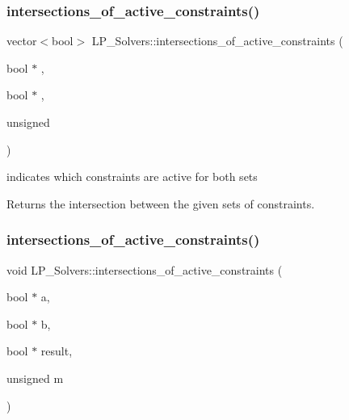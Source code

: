 \subsubsection{\texorpdfstring{intersections\+\_\+of\+\_\+active\+\_\+constraints()}{intersections\_of\_active\_constraints()}\hspace{0.1cm}{\footnotesize\ttfamily [1/2]}}
{\footnotesize\ttfamily vector$<$bool$>$ L\+P\+\_\+\+Solvers\+::intersections\+\_\+of\+\_\+active\+\_\+constraints (\begin{DoxyParamCaption}\item[{bool $\ast$}]{,  }\item[{bool $\ast$}]{,  }\item[{unsigned}]{ }\end{DoxyParamCaption})}



indicates which constraints are active for both sets 

\begin{DoxyReturn}{Returns}
the intersection between the given sets of constraints. 
\end{DoxyReturn}
\mbox{\label{group___c_l_s_solvers_ga1f87ac127ced7d681b3e51e38eef0cf4}} 
\subsubsection{\texorpdfstring{intersections\+\_\+of\+\_\+active\+\_\+constraints()}{intersections\_of\_active\_constraints()}\hspace{0.1cm}{\footnotesize\ttfamily [2/2]}}
{\footnotesize\ttfamily void L\+P\+\_\+\+Solvers\+::intersections\+\_\+of\+\_\+active\+\_\+constraints (\begin{DoxyParamCaption}\item[{bool $\ast$}]{a,  }\item[{bool $\ast$}]{b,  }\item[{bool $\ast$}]{result,  }\item[{unsigned}]{m }\end{DoxyParamCaption})}



